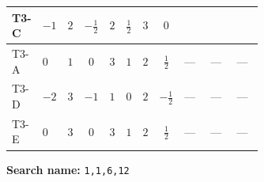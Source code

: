 \documentclass[8pt]{article}
\begin{document}
\begin{landscape}
\begin{longtable}{@{}llcccccc >{\raggedright\arraybackslash}p{0.21\linewidth} >{\raggedright\arraybackslash}p{0.21\linewidth} >{\raggedright\arraybackslash}p{0.21\linewidth}@{}}
T3-C & $-1$ & $2$ & $-\frac{1}{2}$ & $2$ & $\frac{1}{2}$ & $3$ & $0$ & \scriptsize\adjustbox{max width=\linewidth}{$\begin{gathered} \frac{lambda12Inv2 \overline{y_{1}} \overline{y_{2}}}{3 MF}\end{gathered}$} & \scriptsize\adjustbox{max width=\linewidth}{$\begin{gathered} \frac{\sqrt{3} g_{2}^{2} \overline{y_{1}} \overline{y_{2}}}{4 MF}\end{gathered}$} & \scriptsize\adjustbox{max width=\linewidth}{$\begin{gathered} - \frac{\sqrt{3} ye \overline{y_{1}} \overline{y_{2}} \overline{ye}}{12 MF}\end{gathered}$} \\
\midrule
T3-A & $0$ & $1$ & $0$ & $3$ & $1$ & $2$ & $\frac{1}{2}$ & --- & --- & --- \\
\midrule
T3-D & $-2$ & $3$ & $-1$ & $1$ & $0$ & $2$ & $-\frac{1}{2}$ & --- & --- & --- \\
\midrule
T3-E & $0$ & $3$ & $0$ & $3$ & $1$ & $2$ & $\frac{1}{2}$ & --- & --- & --- \\
\midrule
\bottomrule
\end{longtable}
\clearpage
\noindent\textbf{Search name: }\texttt{1,1,6,12}\par\smallskip

\end{landscape}
\end{document}

